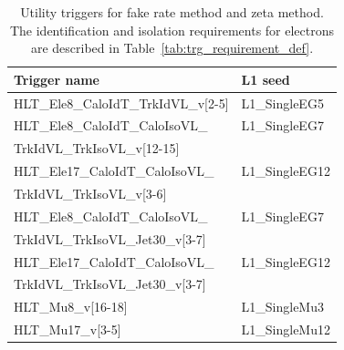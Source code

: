 \begin{table}[!ht]
  \begin{center}
 {\small
  \begin{tabular} {l|l}
\hline
 Trigger name & L1 seed \\
\hline\hline
 HLT\_Ele8\_CaloIdT\_TrkIdVL\_v[2-5]	& L1\_SingleEG5 		\\ %
 HLT\_Ele8\_CaloIdT\_CaloIsoVL\_		& L1\_SingleEG7 		\\ 
 TrkIdVL\_TrkIsoVL\_v[12-15]			&  						\\ %
 HLT\_Ele17\_CaloIdT\_CaloIsoVL\_  		& L1\_SingleEG12		\\ 
 TrkIdVL\_TrkIsoVL\_v[3-6]  			& 						\\ %
 HLT\_Ele8\_CaloIdT\_CaloIsoVL\_      	& L1\_SingleEG7         \\
 TrkIdVL\_TrkIsoVL\_Jet30\_v[3-7]      	& 						\\ %
 HLT\_Ele17\_CaloIdT\_CaloIsoVL\_		& L1\_SingleEG12		\\ 
 TrkIdVL\_TrkIsoVL\_Jet30\_v[3-7]		& 						\\ %
	\hline \hline
 HLT\_Mu8\_v[16-18] 	&  L1\_SingleMu3  		\\ %
 HLT\_Mu17\_v[3-5]      &  L1\_SingleMu12   	\\ %
    \hline 
  \end{tabular}
}
  \caption{Utility triggers for fake rate method and zeta method. 
  The identification and isolation requirements for electrons are described in Table~\ref{tab:trg_requirement_def}.
}
   \label{tab:triggers_util}
  \end{center}
\end{table}

